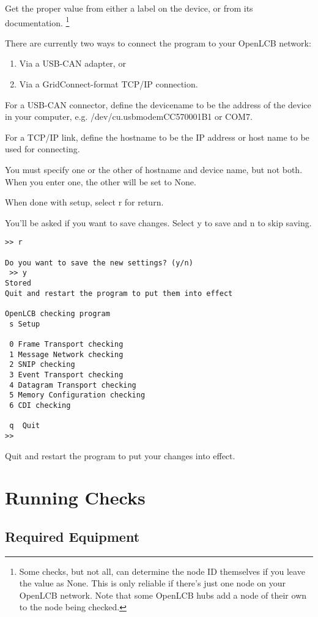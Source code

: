 \documentclass[11pt]{article}
\begin{document}
Get the proper value from either a label on the device, or from its documentation.
\footnote{Some checks, but not all, can determine the node ID themselves if you leave
    the value as None. This is only reliable if there's just one node on your OpenLCB
    network.  Note that some OpenLCB hubs add a node of their own to the node
    being checked.}
    
There are currently two ways to connect the program to your OpenLCB network:
\begin{enumerate}
\item Via a USB-CAN adapter, or
\item Via a GridConnect-format TCP/IP connection.
\end{enumerate}

For a USB-CAN connector, define the devicename to be the address of the device in your computer, 
e.g. /dev/cu.usbmodemCC570001B1 or COM7.

For a TCP/IP link, define the hostname to be the IP address or host name to be used 
for connecting.

You must specify one or the other of hostname and device name, but not both.
When you enter one, the other will be set to None.

When done with setup, select r for return.  

You'll be asked if you want to save changes.  
Select y to save and n to skip saving.

\begin{verbatim}
>> r

Do you want to save the new settings? (y/n)
 >> y
Stored
Quit and restart the program to put them into effect

OpenLCB checking program
 s Setup

 0 Frame Transport checking
 1 Message Network checking
 2 SNIP checking
 3 Event Transport checking
 4 Datagram Transport checking
 5 Memory Configuration checking
 6 CDI checking
  
 q  Quit
>> 
\end{verbatim}

Quit and restart the program to put your changes into effect.

\section{Running Checks}

\subsection{Required Equipment}
\end{document}
